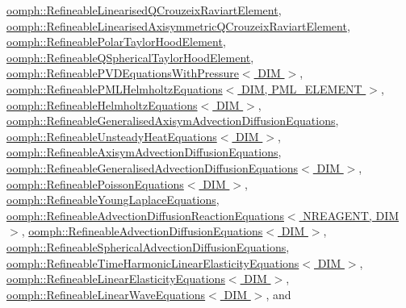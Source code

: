 \hyperlink{classoomph_1_1RefineableLinearisedQCrouzeixRaviartElement_ab705dd0e3b0d4e6feeb8e4273c944e7d}{oomph\+::\+Refineable\+Linearised\+Q\+Crouzeix\+Raviart\+Element}, \hyperlink{classoomph_1_1RefineableLinearisedAxisymmetricQCrouzeixRaviartElement_afd5811a7632c57472e08dbcfa9aba843}{oomph\+::\+Refineable\+Linearised\+Axisymmetric\+Q\+Crouzeix\+Raviart\+Element}, \hyperlink{classoomph_1_1RefineablePolarTaylorHoodElement_aee28f356ae477c5833075e873d72e0d4}{oomph\+::\+Refineable\+Polar\+Taylor\+Hood\+Element}, \hyperlink{classoomph_1_1RefineableQSphericalTaylorHoodElement_a9adcf7a49431c6435eb3decb22ea90d2}{oomph\+::\+Refineable\+Q\+Spherical\+Taylor\+Hood\+Element}, \hyperlink{classoomph_1_1RefineablePVDEquationsWithPressure_a4e4bd0c67eaefb3f34a0744d17d07567}{oomph\+::\+Refineable\+P\+V\+D\+Equations\+With\+Pressure$<$ D\+I\+M $>$}, \hyperlink{classoomph_1_1RefineablePMLHelmholtzEquations_a19a3644f2c65eba0f55a81f63f54ddf5}{oomph\+::\+Refineable\+P\+M\+L\+Helmholtz\+Equations$<$ D\+I\+M, P\+M\+L\+\_\+\+E\+L\+E\+M\+E\+N\+T $>$}, \hyperlink{classoomph_1_1RefineableHelmholtzEquations_a6d3102c899dac5c4e18fee3564323509}{oomph\+::\+Refineable\+Helmholtz\+Equations$<$ D\+I\+M $>$}, \hyperlink{classoomph_1_1RefineableGeneralisedAxisymAdvectionDiffusionEquations_a1de11bc60b5ff64c82d53987f73aee38}{oomph\+::\+Refineable\+Generalised\+Axisym\+Advection\+Diffusion\+Equations}, \hyperlink{classoomph_1_1RefineableUnsteadyHeatEquations_a0363c6a60754b66ac9393ba2f8e18d2b}{oomph\+::\+Refineable\+Unsteady\+Heat\+Equations$<$ D\+I\+M $>$}, \hyperlink{classoomph_1_1RefineableAxisymAdvectionDiffusionEquations_aa5166d104d862bd73edb51deb5a24de0}{oomph\+::\+Refineable\+Axisym\+Advection\+Diffusion\+Equations}, \hyperlink{classoomph_1_1RefineableGeneralisedAdvectionDiffusionEquations_af995cd64e5a189ebfd0565ac931abe1f}{oomph\+::\+Refineable\+Generalised\+Advection\+Diffusion\+Equations$<$ D\+I\+M $>$}, \hyperlink{classoomph_1_1RefineablePoissonEquations_a5e0651853bb43a4636168562a9ce854c}{oomph\+::\+Refineable\+Poisson\+Equations$<$ D\+I\+M $>$}, \hyperlink{classoomph_1_1RefineableYoungLaplaceEquations_ab54a23095ee8aef3fe68542bdfa1400a}{oomph\+::\+Refineable\+Young\+Laplace\+Equations}, \hyperlink{classoomph_1_1RefineableAdvectionDiffusionReactionEquations_ab68dd4feee2b6e4d268e464686254199}{oomph\+::\+Refineable\+Advection\+Diffusion\+Reaction\+Equations$<$ N\+R\+E\+A\+G\+E\+N\+T, D\+I\+M $>$}, \hyperlink{classoomph_1_1RefineableAdvectionDiffusionEquations_af9dd36503e3196a7f640dbcebb22551d}{oomph\+::\+Refineable\+Advection\+Diffusion\+Equations$<$ D\+I\+M $>$}, \hyperlink{classoomph_1_1RefineableSphericalAdvectionDiffusionEquations_ae8ee03bbf706d765a3756a3a2f8804f9}{oomph\+::\+Refineable\+Spherical\+Advection\+Diffusion\+Equations}, \hyperlink{classoomph_1_1RefineableTimeHarmonicLinearElasticityEquations_aafadd0366ea9fab545ad59f80763d8e7}{oomph\+::\+Refineable\+Time\+Harmonic\+Linear\+Elasticity\+Equations$<$ D\+I\+M $>$}, \hyperlink{classoomph_1_1RefineableLinearElasticityEquations_acd2c98989ca38e1534ac70d5b4dc37a5}{oomph\+::\+Refineable\+Linear\+Elasticity\+Equations$<$ D\+I\+M $>$}, \hyperlink{classoomph_1_1RefineableLinearWaveEquations_a057892661a261b6959c3690f6b6e9a6a}{oomph\+::\+Refineable\+Linear\+Wave\+Equations$<$ D\+I\+M $>$}, and 